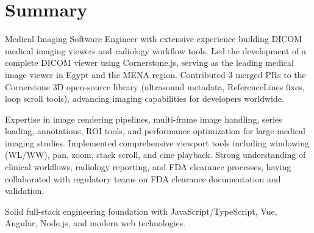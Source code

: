 
\section{Summary}
Medical Imaging Software Engineer with extensive experience building DICOM medical imaging viewers and radiology workflow tools. Led the development of a complete DICOM viewer using Cornerstone.js, serving as the leading medical image viewer in Egypt and the MENA region. Contributed 3 merged PRs to the Cornerstone 3D open-source library (ultrasound metadata, ReferenceLines fixes, loop scroll tools), advancing imaging capabilities for developers worldwide.

\vspace{0.2cm}

Expertise in image rendering pipelines, multi-frame image handling, series loading, annotations, ROI tools, and performance optimization for large medical imaging studies. Implemented comprehensive viewport tools including windowing (WL/WW), pan, zoom, stack scroll, and cine playback. Strong understanding of clinical workflows, radiology reporting, and FDA clearance processes, having collaborated with regulatory teams on FDA clearance documentation and validation.

\vspace{0.2cm}

Solid full-stack engineering foundation with JavaScript/TypeScript, Vue, Angular, Node.js, and modern web technologies.
